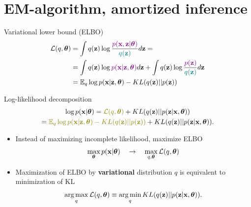 \section{EM-algorithm, amortized inference}
\begin{frame}{Variational lower bound (ELBO)}
	\vspace{-0.3cm}
	\begin{align*}
 	 \mathcal{L} (q, \boldsymbol{\theta}) &= \int q(\mathbf{z}) \log \frac{\color{violet}p(\mathbf{x}, \mathbf{z} | \boldsymbol{\theta})}{\color{teal}q(\mathbf{z})}d\mathbf{z} = \\ 
	  &= \int q(\mathbf{z}) \log {\color{violet}p(\mathbf{x}| \mathbf{z}, \boldsymbol{\theta})} d\mathbf{z} + \int q(\mathbf{z}) \log \frac{\color{violet}p(\mathbf{z})}{\color{teal}q(\mathbf{z})}d\mathbf{z} \\ 
	  &= \mathbb{E}_{q} \log p(\mathbf{x} | \mathbf{z}, \boldsymbol{\theta}) - KL (q(\mathbf{z}) || p(\mathbf{z}))
	\end{align*}
	\vspace{-0.5cm}
	\begin{block}{Log-likelihood decomposition}
		\vspace{-0.8cm}
		\begin{multline*}
			 \log p(\bx| \btheta) = {\color{olive}\mathcal{L} (q, \btheta)} + KL(q(\bz) || p(\bz|\bx, \btheta)) \\ = {\color{olive}\mathbb{E}_{q} \log p(\bx | \bz, \btheta) - KL (q(\bz) || p(\bz))} + KL(q(\bz) || p(\bz|\bx, \btheta)).
		\end{multline*}
		\vspace{-0.7cm}
	\end{block}
	\begin{itemize}
	\item Instead of maximizing incomplete likelihood, maximize ELBO
   	\[
	    \max_{\boldsymbol{\theta}} p(\mathbf{x} | \boldsymbol{\theta}) \quad \rightarrow \quad \max_{q, \boldsymbol{\theta}} \mathcal{L} (q, \boldsymbol{\theta})
   	\]
   	\item Maximization of ELBO by \textbf{variational} distribution $q$ is equivalent to minimization of KL
  	\[
	    \operatorname*{arg\,max}_q \mathcal{L} (q, \boldsymbol{\theta}) \equiv \operatorname*{arg\,min}_q KL(q(\mathbf{z}) || p(\mathbf{z}|\mathbf{x}, \boldsymbol{\theta})).
  	\]
  	\end{itemize}
	   	    
\end{frame}
